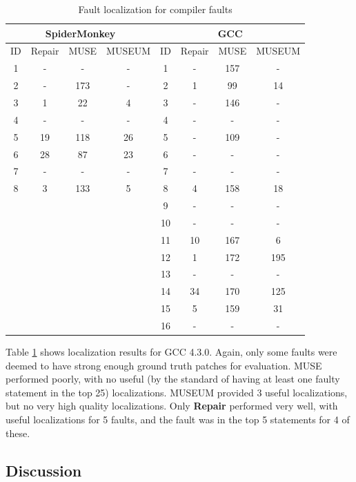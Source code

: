 \begin{table}
\caption{Fault localization for compiler faults}
\centering
{\scriptsize
\begin{tabular}{|c||c|c|c||c||c|c|c|}
\hline
\multicolumn{4}{|c||}{SpiderMonkey}&\multicolumn{4}{|c|}{GCC}\\
\hline
ID& Repair & MUSE & MUSEUM & ID & Repair & MUSE & MUSEUM \\
\hline
1 & - & - & - &         1 & - & 157 & -\\
2 & - & 173 & - &     2 & 1 & 99 & 14\\
3 & 1 & 22 & 4 &       3 & - & 146 & -\\
4 & - & - & - &         4 &  - & - & -\\
5 & 19 & 118 & 26 & 5 & - & 109 & -\\
6 & 28 & 87 & 23 &   6 & - & - & -\\
7 & - & - & - &         7 & - & - & -\\
8 & 3 & 133 & 5 &     8 & 4 & 158 & 18\\
& & & & 9 & - & - & -\\
& & & & 10 & - & - & -\\
& & & & 11 & 10 & 167 & 6\\
& & & & 12 & 1 & 172 & 195\\
& & & & 13 & - & - & -\\
& & & & 14 & 34 & 170 & 125\\
& & & & 15 &  5 & 159 & 31\\
& & & & 16 & - & - & -\\
\hline
\end{tabular}
}
\label{bothtable}
\end{table}

Table \ref{bothtable} shows localization results for GCC 4.3.0.  Again, only some faults were deemed to have strong enough ground truth patches for evaluation.   MUSE performed poorly, with no useful (by the standard of having at least one faulty statement in the top 25) localizations.  MUSEUM provided 3 useful localizations, but no very high quality localizations.  Only {\bf Repair} performed very well, with useful localizations for 5 faults, and the fault was in the top 5 statements for 4 of these.



\subsection{Discussion}

